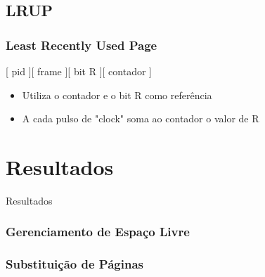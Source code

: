 \documentclass{beamer}
\begin{document}
\subsection{LRUP}
\begin{frame}
\frametitle{Least Recently Used Page}

\begin{center}
[ pid ][ frame ][ bit R ][ contador ]
\end{center}

\begin{itemize}
\item Utiliza o contador e o bit R como referência

\item A cada pulso de "clock" soma ao contador o valor de R
\end{itemize}
\justifying
\end{frame}

\section{Resultados} 
\begin{frame}
\begin{LARGE}
\begin{center}
Resultados
\end{center}
\end{LARGE}
\end{frame}

\begin{frame}
\frametitle{Gerenciamento de Espaço Livre} 

\justifying
\end{frame}


\begin{frame}
\frametitle{Substituição de Páginas} 
\justifying
\end{frame}
\end{document}
